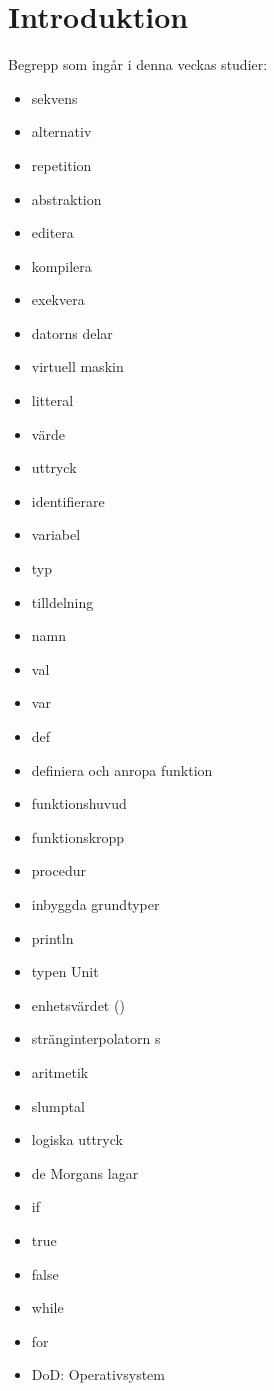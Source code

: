 \chapter{Introduktion}\label{chapter:W01}
Begrepp som ingår i denna veckas studier:
\begin{multicols}{2}\begin{itemize}[noitemsep,label={$\square$},leftmargin=*]
\item sekvens
\item alternativ
\item repetition
\item abstraktion
\item editera
\item kompilera
\item exekvera
\item datorns delar
\item virtuell maskin
\item litteral
\item värde
\item uttryck
\item identifierare
\item variabel
\item typ
\item tilldelning
\item namn
\item val
\item var
\item def
\item definiera och anropa funktion
\item funktionshuvud
\item funktionskropp
\item procedur
\item inbyggda grundtyper
\item println
\item typen Unit
\item enhetsvärdet ()
\item stränginterpolatorn s
\item aritmetik
\item slumptal
\item logiska uttryck
\item de Morgans lagar
\item if
\item true
\item false
\item while
\item for
\item DoD: Operativsystem\end{itemize}\end{multicols}
